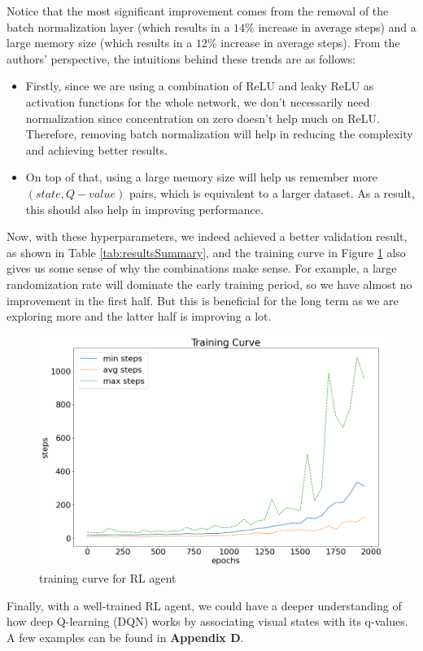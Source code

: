 \documentclass[letterpaper]{article} %
\begin{document}
\begin{itemize}
  Notice that the most significant improvement comes from the removal of the batch normalization layer (which results in a $14\%$ increase in average steps) and a large memory size (which results in a $12\%$ increase in average steps). From the authors' perspective, the intuitions behind these trends are as follows:
  \begin{itemize}
    \item 
    Firstly, since we are using a combination of ReLU and leaky ReLU as activation functions for the whole network, we don't necessarily need normalization since concentration on zero doesn't help much on ReLU. Therefore, removing batch normalization will help in reducing the complexity and achieving better results.
    \item 
    On top of that, using a large memory size will help us remember more $(state, Q-value)$ pairs, which is equivalent to a larger dataset. As a result, this should also help in improving performance.
  \end{itemize}
  Now, with these hyperparameters, we indeed achieved a better validation result, as shown in Table \ref{tab:resultsSummary}, and the training curve in Figure \ref{fig:tc} also gives us some sense of why the combinations make sense. For example, a large randomization rate will dominate the early training period, so we have almost no improvement in the first half. But this is beneficial for the long term as we are exploring more and the latter half is improving a lot.
 
  \begin{figure}[h!]
    \centering
    \includegraphics[width=0.9\linewidth]{figures/train_curve}
    \caption{training curve for RL agent}
    \label{fig:tc}
  \end{figure}

  Finally, with a well-trained RL agent, we could have a deeper understanding of how deep Q-learning (DQN) works by associating visual states with its q-values. A few examples can be found in \textbf{Appendix D}.
\end{itemize}
\end{document}
